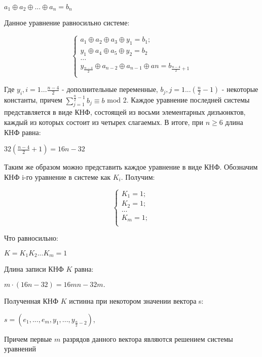 \documentclass[12pt]{article}
\begin{document}
\begin{center}
$a_{1} \oplus a_{2} \oplus ... \oplus a_{n} = b_{n}$
\end{center}
\newpage

Данное уравнение равносильно системе: 

\[
\begin{cases}
a_{1} \oplus a_{2} \oplus a_{3} \oplus y_{1} = b_{1}; \\
y_{1} \oplus a_{4} \oplus a_{5} \oplus y_{2} = b_{2}\\
\dots \\
y_{\frac{n-4}{2}} \oplus a_{n - 2} \oplus a_{n - 1} \oplus a{n} = b_{\frac{n-4}{2} + 1}\\
\end{cases}
\]

Где $y_{i}, i = 1...\frac{n-4}{2}$ - дополнительные переменные, $b_{j}, j = 1...(\frac{n}{2} - 1)$ - некоторые константы, причем $ \sum_{j = 1}^{\frac{n}{2} - 1} b_{j} \equiv b$  mod 2. 
Каждое уравнение последней системы представляется в виде КНФ, состоящей из восьми элементарных дизъюнктов, каждый из которых состоит из четырех слагаемых. В итоге, при $ n \geq 6$ длина КНФ равна: 

\begin{center}
$ 32(\frac{n-4}{2} + 1) = 16n - 32$
\end{center}

Таким же образом можно представить каждое уравнение в виде КНФ. Обозначим КНФ i-го уравнение в системе как $K_{i}$. Получим:

\[
\begin{cases}
K_{1} = 1; \\
K_{2} = 1;\\
\dots \\
K_{m} = 1;\\
\end{cases}
\]

Что равносильно:
\begin{center}
$K = K_{1}K_{2}...K_{m} = 1$
\end{center}

Длина записи КНФ $K$ равна:
\begin{center}
$m \cdot (16n - 32) = 16mn - 32m.$
\end{center}

Полученная КНФ $K$ истинна при некотором значении вектора s:

\begin{center}
$s = (e_{1}, ... , e_{m}, y_{1}, ... , y_{\frac{n}{2} - 2})$,
\end{center}
Причем первые $m$ разрядов данного вектора являются решением системы уравнений
\end{document}
